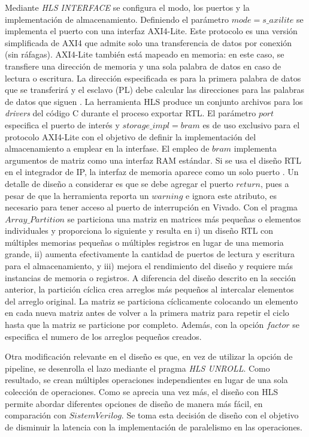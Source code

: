 \documentclass[conference]{IEEEtran}
\begin{document}
 Mediante  \textit{ HLS  INTERFACE} se configura el modo, los puertos y la implementación de almacenamiento. Definiendo el parámetro $mode=s\_axilite$ se implementa el puerto con una interfaz AXI4-Lite. Este protocolo es una versión simplificada de AXI4  que admite solo una transferencia de datos por conexión (sin ráfagas). AXI4-Lite también está mapeado en memoria: en este caso, se transfiere una dirección de memoria y una sola palabra de datos en caso de lectura o escritura. La dirección especificada es para la primera palabra de datos que se transferirá y el esclavo (PL) debe calcular las direcciones para las palabras de datos que siguen \cite{crockett2014zynq}. La herramienta HLS produce un conjunto archivos para los \textit{drivers} del código C  durante el proceso exportar RTL. El parámetro $port$ especifica el puerto de interés y $storage\_impl = bram$ es de uso exclusivo para el protocolo  AXI4-Lite con el objetivo de definir la implementación del almacenamiento a emplear en la interfase. El empleo de $bram$ implementa argumentos de matriz como una interfaz RAM estándar. Si se usa el diseño RTL en el integrador de IP, la interfaz de memoria aparece como un solo puerto \cite{website2021}. Un detalle de diseño a considerar es que se debe agregar el puerto $return$, pues a pesar de que la herramienta reporta un $warning$ e ignora este atributo, es necesario para tener acceso al puerto de interrupción en Vivado.
 Con el pragma $Array\_Partition$ se particiona una matriz en matrices más pequeñas o elementos individuales y proporciona lo siguiente y resulta en i) un diseño RTL con múltiples memorias pequeñas o múltiples registros en lugar de una memoria grande, ii) aumenta efectivamente la cantidad de puertos de lectura y escritura para el almacenamiento, y iii) mejora el rendimiento del diseño y requiere más instancias de memoria o registros. A diferencia del diseño descrito en la sección anterior, la partición cíclica crea arreglos más pequeños al intercalar elementos del arreglo original. La matriz se particiona cíclicamente colocando un elemento en cada nueva matriz antes de volver a la primera matriz para repetir el ciclo hasta que la matriz se particione por completo. Además, con la opción $factor$ se especifica el numero de los arreglos pequeños creados.\par
 Otra modificación relevante en el diseño es que, en vez de utilizar la opción de pipeline, se desenrolla el lazo mediante el pragma \textit{HLS UNROLL}. Como resultado, se crean múltiples operaciones independientes en lugar de una sola colección de operaciones. Como se aprecia una vez más, el diseño con HLS permite abordar diferentes opciones de diseño de manera más fácil, en comparación con $SistemVerilog$. Se toma esta decisión de diseño con el objetivo de disminuir la latencia con la implementación de paralelismo en las operaciones.\par
\end{document}
